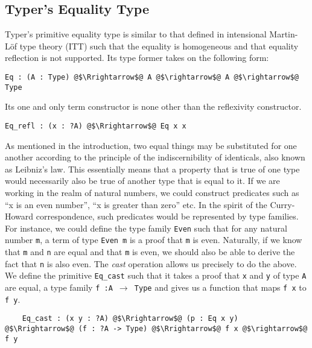 \documentclass[12pt,twoside,maitrise]{dms}
\theoremstyle{definition}
\numberwithin{equation}{section}
\numberwithin{table}{chapter}
\numberwithin{figure}{chapter}
\newcommand\id[1] {\texttt{#1}}
\newcommand\fn[1] {\texttt{#1}}
\begin{document}
\subsection{Typer's Equality Type}\label{sec:typer-old-eq}

Typer's primitive equality type is similar to that defined in intensional
Martin-Löf type theory\cite{martin1975intuitionistic} (ITT) such that the
equality is homogeneous and that equality reflection is not supported. Its type
former takes on the following form:

\begin{verbatim}
Eq : (A : Type) @$\Rrightarrow$@ A @$\rightarrow$@ A @$\rightarrow$@ Type
\end{verbatim}

Its one and only term constructor is none other than the reflexivity constructor.

\begin{verbatim}
Eq_refl : (x : ?A) @$\Rrightarrow$@ Eq x x
\end{verbatim}

As mentioned in the introduction, two equal things may be substituted for one
another according to the principle of the indiscernibility of identicals, also
known as Leibniz's law. This essentially means that a property that is true of
one type would necessarily also be true of another type that is equal to it. If
we are working in the realm of natural numbers, we could construct predicates
such as ``x is an even number'', ``x is greater than zero'' etc. In the spirit
of the Curry-Howard correspondence, such predicates would be represented by type
families. For instance, we could define the type family \id{Even} such that for
any natural number \id{m}, a term of type \fn{Even m} is a proof that \id{m} is
even. Naturally, if we know that \id{m} and \id{n} are equal and that \id{m} is
even, we should also be able to derive the fact that \id{n} is also even. The
\emph{cast} operation allows us precisely to do the above. We define the
primitive \id{Eq\_cast} such that it takes a proof that \id{x} and \id{y} of
type \id{A} are equal, a type family \fn{f :\@ A $\rightarrow$ Type} and
gives us a function that maps \fn{f x} to \fn{f y}.

\begin{verbatim}
    Eq_cast : (x y : ?A) @$\Rrightarrow$@ (p : Eq x y) @$\Rrightarrow$@ (f : ?A -> Type) @$\Rrightarrow$@ f x @$\rightarrow$@ f y
\end{verbatim}
\end{document}
